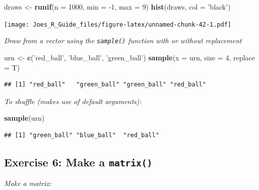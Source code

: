 \documentclass[
]{book}
\newenvironment{Shaded}{\begin{snugshade}}{\end{snugshade}}
\newcommand{\DataTypeTok}[1]{\textcolor[rgb]{0.13,0.29,0.53}{#1}}
\newcommand{\DecValTok}[1]{\textcolor[rgb]{0.00,0.00,0.81}{#1}}
\newcommand{\KeywordTok}[1]{\textcolor[rgb]{0.13,0.29,0.53}{\textbf{#1}}}
\newcommand{\NormalTok}[1]{#1}
\newcommand{\StringTok}[1]{\textcolor[rgb]{0.31,0.60,0.02}{#1}}
\begin{document}
\begin{Shaded}
\begin{Highlighting}[]
\NormalTok{draws <-}\StringTok{ }\KeywordTok{runif}\NormalTok{(}\DataTypeTok{n =} \DecValTok{1000}\NormalTok{, }\DataTypeTok{min =} \DecValTok{-1}\NormalTok{, }\DataTypeTok{max =} \DecValTok{9}\NormalTok{)}
\KeywordTok{hist}\NormalTok{(draws, }\DataTypeTok{col =} \StringTok{'black'}\NormalTok{)}
\end{Highlighting}
\end{Shaded}

\texttt{[image: Joes\_R\_Guide\_files/figure-latex/unnamed-chunk-42-1.pdf]}

\emph{Draw from a vector using the \texttt{sample()} function with or without replacement}

\begin{Shaded}
\begin{Highlighting}[]
\NormalTok{urn <-}\StringTok{ }\KeywordTok{c}\NormalTok{(}\StringTok{'red_ball'}\NormalTok{, }\StringTok{'blue_ball'}\NormalTok{, }\StringTok{'green_ball'}\NormalTok{)}
\KeywordTok{sample}\NormalTok{(}\DataTypeTok{x =}\NormalTok{ urn, }\DataTypeTok{size =} \DecValTok{4}\NormalTok{, }\DataTypeTok{replace =}\NormalTok{ T)}
\end{Highlighting}
\end{Shaded}

\begin{verbatim}
## [1] "red_ball"   "green_ball" "green_ball" "red_ball"
\end{verbatim}

\emph{To shuffle (makes use of default arguments):}

\begin{Shaded}
\begin{Highlighting}[]
\KeywordTok{sample}\NormalTok{(urn)}
\end{Highlighting}
\end{Shaded}

\begin{verbatim}
## [1] "green_ball" "blue_ball"  "red_ball"
\end{verbatim}

\hypertarget{exercise-6-make-a-matrix}{%
\subsection{\texorpdfstring{Exercise 6: Make a \texttt{matrix()}}{Exercise 6: Make a matrix()}}\label{exercise-6-make-a-matrix}}

\emph{Make a matrix:}
\end{document}
